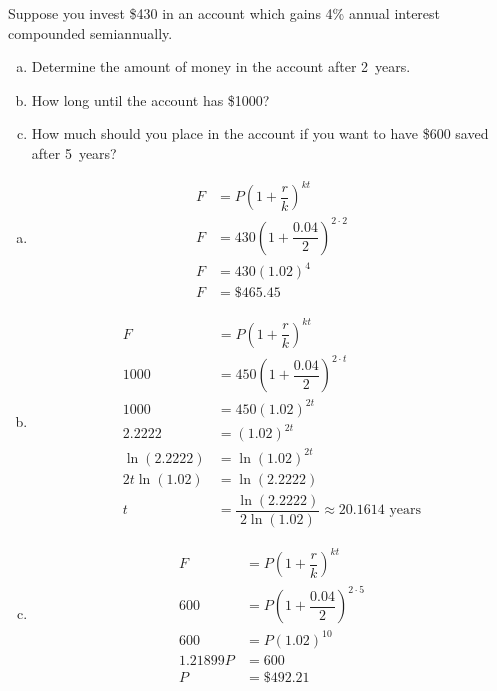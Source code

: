 \documentclass[11pt,letterpaper]{article}
\begin{document}
\newpage





 Suppose you invest \$430 in an account which gains 4\% annual interest compounded semiannually. 
        \begin{enumerate}[(a)]
        \item Determine the amount of money in the account after 2~years.
        \item How long until the account has \$1000?
        \item How much should you place in the account if you want to have \$600 saved after 5~years?
        \end{enumerate} \pspace

\sol 
\begin{enumerate}[(a)]
\item 
	\[
	\begin{aligned}
	F&= P \left( 1 + \dfrac{r}{k} \right)^{kt} \\
	F&= 430 \left( 1 + \dfrac{0.04}{2} \right)^{2 \cdot 2} \\
	F&= 430 (1.02)^4 \\
	F&= \$465.45
	\end{aligned}
	\] \pspace

\item 
	\[
	\begin{aligned}
	F&= P \left( 1 + \dfrac{r}{k} \right)^{kt} \\
	1000&= 450 \left( 1 + \dfrac{0.04}{2} \right)^{2 \cdot t} \\
	1000&= 450 (1.02)^{2t} \\
	2.2222&= (1.02)^{2t} \\
	\ln(2.2222)&= \ln(1.02)^{2t} \\
	2t \ln(1.02)&= \ln(2.2222) \\
	t&= \dfrac{\ln(2.2222)}{2 \ln(1.02)} \approx 20.1614 \text{ years}
	\end{aligned}
	\] \pspace

\item 
	\[
	\begin{aligned}
	F&= P \left( 1 + \dfrac{r}{k} \right)^{kt} \\
	600&= P \left( 1 + \dfrac{0.04}{2} \right)^{2 \cdot 5} \\
	600&= P (1.02)^{10} \\
	1.21899P&= 600 \\
	P&= \$492.21
	\end{aligned}
	\]
\end{enumerate}
\end{document}
